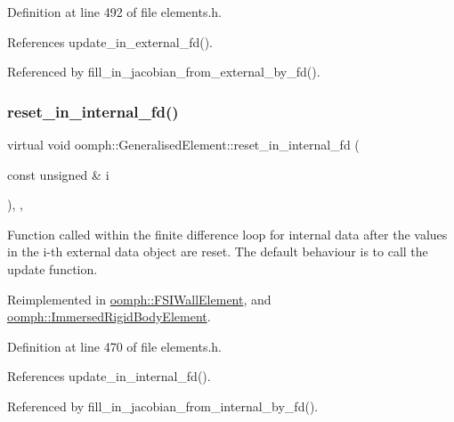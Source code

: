 Definition at line 492 of file elements.\+h.



References update\+\_\+in\+\_\+external\+\_\+fd().



Referenced by fill\+\_\+in\+\_\+jacobian\+\_\+from\+\_\+external\+\_\+by\+\_\+fd().

\mbox{\label{classoomph_1_1GeneralisedElement_a89c6c5cf8b4d8b451caa124b346e5e8d}} 
\subsubsection{\texorpdfstring{reset\+\_\+in\+\_\+internal\+\_\+fd()}{reset\_in\_internal\_fd()}}
{\footnotesize\ttfamily virtual void oomph\+::\+Generalised\+Element\+::reset\+\_\+in\+\_\+internal\+\_\+fd (\begin{DoxyParamCaption}\item[{const unsigned \&}]{i }\end{DoxyParamCaption})\hspace{0.3cm}{\ttfamily [inline]}, {\ttfamily [protected]}, {\ttfamily [virtual]}}



Function called within the finite difference loop for internal data after the values in the i-\/th external data object are reset. The default behaviour is to call the update function. 



Reimplemented in \hyperlink{classoomph_1_1FSIWallElement_aed714993ced295b7ddb5f014ffc2ba6a}{oomph\+::\+F\+S\+I\+Wall\+Element}, and \hyperlink{classoomph_1_1ImmersedRigidBodyElement_a6e1d1fa9a6808691d6c067d45d108d2e}{oomph\+::\+Immersed\+Rigid\+Body\+Element}.



Definition at line 470 of file elements.\+h.



References update\+\_\+in\+\_\+internal\+\_\+fd().



Referenced by fill\+\_\+in\+\_\+jacobian\+\_\+from\+\_\+internal\+\_\+by\+\_\+fd().

